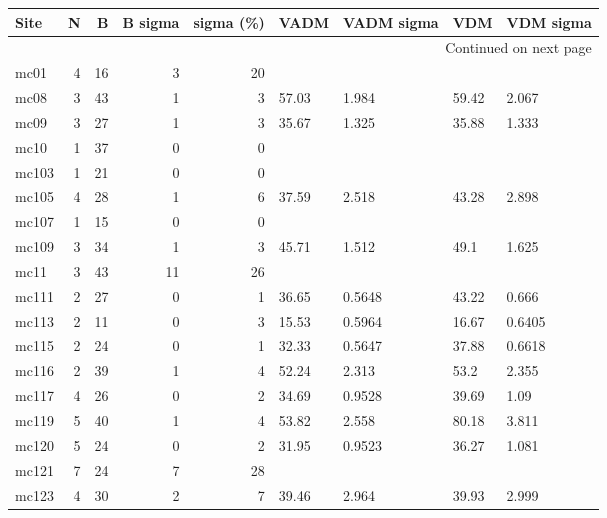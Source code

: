 \documentclass{article}
\begin{document}
\begin{longtable}{lrrrrllll}
\toprule
  Site &  N &   B &  B sigma &  sigma (\%) &   VADM & VADM sigma &    VDM & VDM sigma \\
\midrule
\endhead
\midrule
\multicolumn{9}{r}{{Continued on next page}} \\
\midrule
\endfoot

\bottomrule
\endlastfoot
  mc01 &  4 &  16 &        3 &         20 &        &            &        &           \\
  mc08 &  3 &  43 &        1 &          3 &  57.03 &      1.984 &  59.42 &     2.067 \\
  mc09 &  3 &  27 &        1 &          3 &  35.67 &      1.325 &  35.88 &     1.333 \\
  mc10 &  1 &  37 &        0 &          0 &        &            &        &           \\
 mc103 &  1 &  21 &        0 &          0 &        &            &        &           \\
 mc105 &  4 &  28 &        1 &          6 &  37.59 &      2.518 &  43.28 &     2.898 \\
 mc107 &  1 &  15 &        0 &          0 &        &            &        &           \\
 mc109 &  3 &  34 &        1 &          3 &  45.71 &      1.512 &   49.1 &     1.625 \\
  mc11 &  3 &  43 &       11 &         26 &        &            &        &           \\
 mc111 &  2 &  27 &        0 &          1 &  36.65 &     0.5648 &  43.22 &     0.666 \\
 mc113 &  2 &  11 &        0 &          3 &  15.53 &     0.5964 &  16.67 &    0.6405 \\
 mc115 &  2 &  24 &        0 &          1 &  32.33 &     0.5647 &  37.88 &    0.6618 \\
 mc116 &  2 &  39 &        1 &          4 &  52.24 &      2.313 &   53.2 &     2.355 \\
 mc117 &  4 &  26 &        0 &          2 &  34.69 &     0.9528 &  39.69 &      1.09 \\
 mc119 &  5 &  40 &        1 &          4 &  53.82 &      2.558 &  80.18 &     3.811 \\
 mc120 &  5 &  24 &        0 &          2 &  31.95 &     0.9523 &  36.27 &     1.081 \\
 mc121 &  7 &  24 &        7 &         28 &        &            &        &           \\
 mc123 &  4 &  30 &        2 &          7 &  39.46 &      2.964 &  39.93 &     2.999 \\

\end{longtable}
\end{document}
